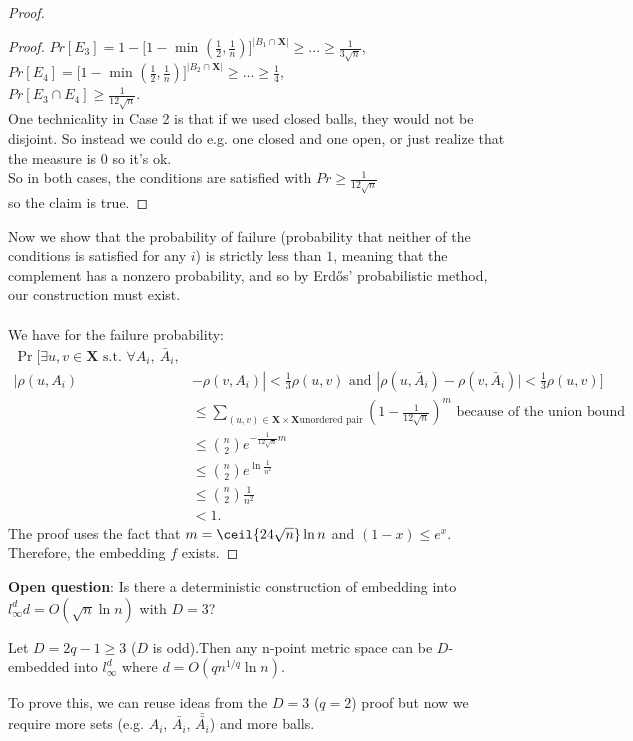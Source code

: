 \begin{proof}
\begin{proof}
$Pr[E_3] = 1 - [1-$ min $(\frac{1}{2},\frac{1}{n})]^{|B_1\cap \mathbf{X}|} 
\geq ... \geq \frac{1}{3\sqrt{n}}$,\\
$Pr[E_4] = [1-$ min $(\frac{1}{2},\frac{1}{n})]^{|B_2\cap \mathbf{X}|} 
\geq ... \geq \frac{1}{4}$,\\
$Pr[E_3\cap E_4]\geq \frac{1}{12\sqrt{n}}$.\\
One technicality in Case 2 is that if we used closed balls, 
they would not be disjoint. So instead we could do e.g. one 
closed and one open, or just realize that the measure is $0$
so it's ok.
\\
So in both cases, the conditions are satisfied with 
$Pr \geq \frac{1}{12\sqrt{n}}$ \\
so the claim is true.
\end{proof}

Now we show that the probability of failure (probability
that neither of the conditions is satisfied for any $i$)
is strictly less than $1$, meaning that the complement has 
a nonzero probability, and so by Erd\H{o}s' 
probabilistic method, our construction must exist. \\
\\
We have for the failure probability: \\
\begin{align*}
\Pr\bigg[\exists u,v \in \mathbf{X} \textrm{ s.t. } \forall
  A_i,\ \bar{A}_i,\\|\rho (u,A_i) &- \rho (v, A_i) | < \frac{1}{3}
  \rho (u,v) \textrm{ and } |\rho (u,\bar{A}_i) - \rho (v, \bar{A}_i)
  | < \frac{1}{3} \rho (u,v) \bigg]\\ 
&\leq \sum_{(u,v)\in \mathbf{X}\times \mathbf{X} \textrm{unordered
    pair}} (1-\frac{1}{12\sqrt{n}})^m \textrm{ because of the union
  bound}\\ 
&\leq \binom{n}{2} e^{-\frac{1}{12\sqrt{n}}m}\\
&\leq \binom{n}{2} e^{\ln \frac{1}{n^2}}\\
&\leq \binom{n}{2} \frac{1}{n^2}\\
&<1.
\end{align*}
The proof uses the fact that $m=\ceil{24 \sqrt{n}} \ln n$ and $(1-x)
\leq e^{x}$.\\ 
Therefore, the embedding $f$ exists.


\end{proof}
\textbf{Open question}: Is there a deterministic construction of
embedding into $l_\infty^d d = O(\sqrt{n}\ln n)$ with $D=3$? 

\begin{theorem}
Let $D=2q-1\geq 3$ ($D$ is odd).Then any n-point metric space can 
be $D$-embedded into $l_\infty^d$ where $d=O(q n^{1/q} \ln n)$.
\end{theorem}
To prove this, we can reuse ideas from the $D=3$ ($q=2$)
proof but now 
we require more sets (e.g. $A_i$, $\bar{A_i}$, $\bar{\bar{A_i}}$) and more balls. \\

